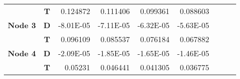 \begin{table}[htbp]
\begin{tabular}{rcrrrrrrr}
          & \textbf{T} & 0.124872 & 0.111406 & 0.099361 & 0.088603 &       &       &  \\
    \multicolumn{1}{l}{\textbf{Node 3}} & \textbf{D} & -8.01E-05 & -7.11E-05 & -6.32E-05 & -5.63E-05 &       &       &  \\
          & \textbf{T} & 0.096109 & 0.085537 & 0.076184 & 0.067882 &       &       &  \\
    \multicolumn{1}{l}{\textbf{Node 4}} & \textbf{D} & -2.09E-05 & -1.85E-05 & -1.65E-05 & -1.46E-05 &       &       &  \\
          & \textbf{T} & 0.05231 & 0.046441 & 0.041305 & 0.036775 &       &       &  \\
\cmidrule{1-6}    \end{tabular}%
  \label{tab:addlabel}%
\end{table}
\newpage

